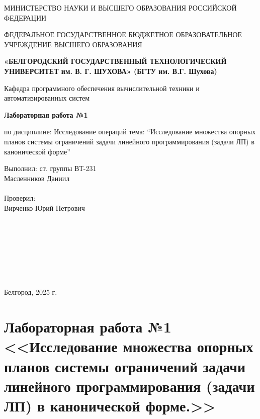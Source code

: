 \documentclass{report}
\newcommand{\q}[1]{``#1''}
\begin{document}
	\begin{titlepage}
		\begin{center}
			МИНИСТЕРСТВО НАУКИ И ВЫСШЕГО ОБРАЗОВАНИЯ\linebreak 
			РОССИЙСКОЙ ФЕДЕРАЦИИ\medskip
			
			ФЕДЕРАЛЬНОЕ ГОСУДАРСТВЕННОЕ БЮДЖЕТНОЕ ОБРАЗОВАТЕЛЬНОЕ 
			УЧРЕЖДЕНИЕ ВЫСШЕГО ОБРАЗОВАНИЯ\medskip
			
			\textbf{
				«БЕЛГОРОДСКИЙ ГОСУДАРСТВЕННЫЙ \linebreak
				ТЕХНОЛОГИЧЕСКИЙ УНИВЕРСИТЕТ им. В. Г. ШУХОВА»\linebreak
				(БГТУ им. В.Г. Шухова)
			}\bigskip
			
			Кафедра программного обеспечения вычислительной техники и автоматизированных систем
			\vspace{5cm}
			
			\Large\textbf{Лабораторная работа №1}
			
			\large по дисциплине: Исследование операций\linebreak
			тема: \q{Исследование множества опорных планов системы ограничений
				задачи линейного программирования (задачи ЛП) в канонической
				форме}
		\end{center}\vspace{6cm}
		
		\begin{flushright}
			\begin{minipage}{7cm}
				Выполнил: ст. группы ВТ-231\\
				Масленников Даниил\\
				\\
				Проверил: \\
				Вирченко Юрий Петрович\\
			\end{minipage}
		\end{flushright}\bigskip
		
		\
		
		\
		
		\
		
		\
		
		
		\begin{center}
			Белгород, 2025 г.
		\end{center}
	\end{titlepage}
	
	\newpage
	
	\setcounter{secnumdepth}{-1}
	\chapter{Лабораторная работа №1 <<Исследование множества опорных планов системы ограничений
		задачи линейного программирования (задачи ЛП) в канонической
		форме.>>}
	
\end{document}
